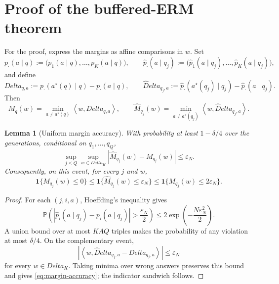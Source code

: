 \documentclass[11pt]{article}
\def\Delta{Delta}%
\newtheorem{lemma}[theorem]{Lemma}
\newcommand{\Pp}{\mathbb P}
\newcommand{\one}{\mathbf 1}
\newcommand{\eps}{\varepsilon}
\newcommand{\abs}[1]{\left|#1\right|}
\newcommand{\inner}[2]{\left\langle#1,#2\right\rangle}
\begin{document}
\appendix

\section{Proof of the buffered-ERM theorem}
\label{app:buffered-proof}

For the proof, express the margins as affine comparisons in $w$.  Set
\[
p_\cdot(a\mid q)
:=
\bigl(p_1(a\mid q),\dots,p_K(a\mid q)\bigr),
\qquad
\widehat p_\cdot(a\mid q_j)
:=
\bigl(\widehat p_1(a\mid q_j),\dots,
\widehat p_K(a\mid q_j)\bigr),
\]
and define
\begin{equation}
\label{eq:gap-vectors}
\Delta_{q,a}
:=
p_\cdot(a^\star(q)\mid q)-p_\cdot(a\mid q),
\qquad
\widehat\Delta_{q_j,a}
:=
\widehat p_\cdot(a^\star(q_j)\mid q_j)
-\widehat p_\cdot(a\mid q_j).
\end{equation}
Then
\begin{equation}
\label{eq:margin-linear-form}
M_q(w)=\min_{a\ne a^\star(q)}\inner{w}{\Delta_{q,a}},
\qquad
\widehat M_{q_j}(w)
=\min_{a\ne a^\star(q_j)}\inner{w}{\widehat\Delta_{q_j,a}}.
\end{equation}

\begin{lemma}[Uniform margin accuracy]
\label{lem:margin-accuracy}
With probability at least $1-\delta/4$ over the generations, conditional on $q_1,\dots,q_Q$,
\begin{equation}
\label{eq:margin-accuracy}
\sup_{j\le Q}\sup_{w\in\Delta_K}
\abs{\widehat M_{q_j}(w)-M_{q_j}(w)}
\le\eps_N.
\end{equation}
Consequently, on this event, for every $j$ and $w$,
\begin{equation}
\label{eq:sandwich}
\one\{M_{q_j}(w)\le0\}
\le
\one\{\widehat M_{q_j}(w)\le\eps_N\}
\le
\one\{M_{q_j}(w)\le2\eps_N\}.
\end{equation}
\end{lemma}

\begin{proof}
For each $(j,i,a)$, Hoeffding's inequality gives
\[
\Pp\left(
\abs{\widehat p_i(a\mid q_j)-p_i(a\mid q_j)}>\frac{\eps_N}{2}
\right)
\le
2\exp\left(-\frac{N\eps_N^2}{2}\right).
\]
A union bound over at most $KAQ$ triples makes the probability of any violation at most $\delta/4$.  On the complementary event,
\[
\abs{\inner{w}{\widehat\Delta_{q_j,a}-\Delta_{q_j,a}}}
\le\eps_N
\]
for every $w\in\Delta_K$.  Taking minima over wrong answers preserves this bound and gives \eqref{eq:margin-accuracy}; the indicator sandwich follows.
\end{proof}
\end{document}
